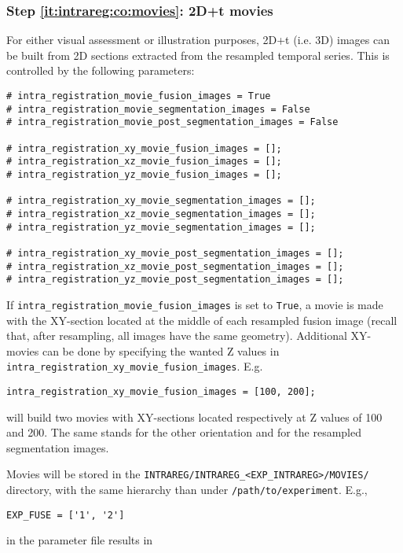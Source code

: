 \subsubsection{Step \ref{it:intrareg:co:movies}: 2D+t movies}
\label{sec:cli:intraregistration:movies}
For either visual assessment or illustration purposes, 2D+t (i.e. 3D) images can be built from 2D sections extracted from the resampled temporal series. This is controlled by the following parameters:
\begin{verbatim}
# intra_registration_movie_fusion_images = True
# intra_registration_movie_segmentation_images = False
# intra_registration_movie_post_segmentation_images = False

# intra_registration_xy_movie_fusion_images = [];
# intra_registration_xz_movie_fusion_images = [];
# intra_registration_yz_movie_fusion_images = [];

# intra_registration_xy_movie_segmentation_images = [];
# intra_registration_xz_movie_segmentation_images = [];
# intra_registration_yz_movie_segmentation_images = [];

# intra_registration_xy_movie_post_segmentation_images = [];
# intra_registration_xz_movie_post_segmentation_images = [];
# intra_registration_yz_movie_post_segmentation_images = [];
\end{verbatim}

If \verb|intra_registration_movie_fusion_images| is set to \verb|True|, a movie is made with the  XY-section located at the middle of each resampled fusion image (recall that, after resampling, all images have the same geometry). Additional XY-movies can be done by specifying the wanted Z values in \verb|intra_registration_xy_movie_fusion_images|. E.g.
\begin{verbatim}
intra_registration_xy_movie_fusion_images = [100, 200];
\end{verbatim}
will build two movies with XY-sections located respectively at Z values of 100 and 200. The same stands for the other orientation and for the resampled segmentation images.

Movies will be stored in the
\texttt{INTRAREG/INTRAREG\_<EXP\_INTRAREG>/MOVIES/} directory, with the same
hierarchy than under \texttt{/path/to/experiment}. E.g., 
\begin{verbatim}
EXP_FUSE = ['1', '2']
\end{verbatim}
in the parameter file results in

\mbox{}
\mbox{}


